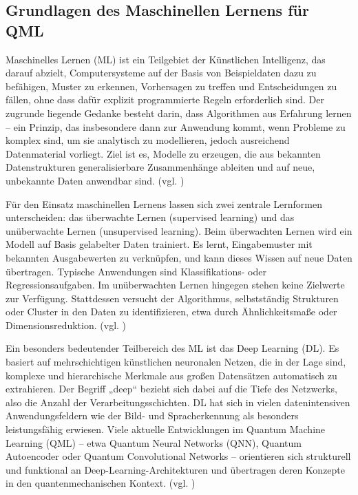 \subsection{Grundlagen des Maschinellen Lernens für QML}
Maschinelles Lernen (ML) ist ein Teilgebiet der Künstlichen Intelligenz, das darauf abzielt, Computersysteme auf der Basis von Beispieldaten dazu zu befähigen, Muster zu erkennen, Vorhersagen zu treffen und Entscheidungen zu fällen, ohne dass dafür explizit programmierte Regeln erforderlich sind. Der zugrunde liegende Gedanke besteht darin, dass Algorithmen aus Erfahrung lernen – ein Prinzip, das insbesondere dann zur Anwendung kommt, wenn Probleme zu komplex sind, um sie analytisch zu modellieren, jedoch ausreichend Datenmaterial vorliegt. Ziel ist es, Modelle zu erzeugen, die aus bekannten Datenstrukturen generalisierbare Zusammenhänge ableiten und auf neue, unbekannte Daten anwendbar sind. (vgl. \cite{alpaydin_introduction_2020})

Für den Einsatz maschinellen Lernens lassen sich zwei zentrale Lernformen unterscheiden: das überwachte Lernen (supervised learning) und das unüberwachte Lernen (unsupervised learning). Beim überwachten Lernen wird ein Modell auf Basis gelabelter Daten trainiert. Es lernt, Eingabemuster mit bekannten Ausgabewerten zu verknüpfen, und kann dieses Wissen auf neue Daten übertragen. Typische Anwendungen sind Klassifikations- oder Regressionsaufgaben. Im unüberwachten Lernen hingegen stehen keine Zielwerte zur Verfügung. Stattdessen versucht der Algorithmus, selbstständig Strukturen oder Cluster in den Daten zu identifizieren, etwa durch Ähnlichkeitsmaße oder Dimensionsreduktion. (vgl. \cite{ertel_grundkurs_2025})

Ein besonders bedeutender Teilbereich des ML ist das Deep Learning (DL). Es basiert auf mehrschichtigen künstlichen neuronalen Netzen, die in der Lage sind, komplexe und hierarchische Merkmale aus großen Datensätzen automatisch zu extrahieren. Der Begriff „deep“ bezieht sich dabei auf die Tiefe des Netzwerks, also die Anzahl der Verarbeitungsschichten. DL hat sich in vielen datenintensiven Anwendungsfeldern wie der Bild- und Spracherkennung als besonders leistungsfähig erwiesen. Viele aktuelle Entwicklungen im Quantum Machine Learning (QML) – etwa Quantum Neural Networks (QNN), Quantum Autoencoder oder Quantum Convolutional Networks – orientieren sich strukturell und funktional an Deep-Learning-Architekturen und übertragen deren Konzepte in den quantenmechanischen Kontext. (vgl. \cite{ertel_grundkurs_2025})

